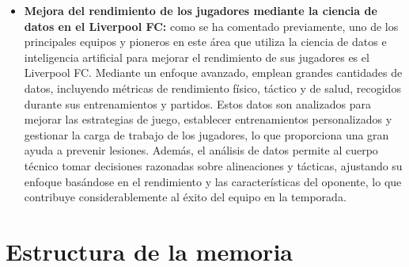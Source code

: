 \begin{itemize}
\item \textbf{Mejora del rendimiento de los jugadores mediante la ciencia de datos en el Liverpool FC:} como se ha comentado previamente, uno de los principales equipos y pioneros en este área que utiliza la ciencia de datos e inteligencia artificial para mejorar el rendimiento de sus jugadores es el Liverpool FC. Mediante un enfoque avanzado, emplean grandes cantidades de datos, incluyendo métricas de rendimiento físico, táctico y de salud, recogidos durante sus entrenamientos y partidos. Estos datos son analizados para mejorar las estrategias de juego, establecer entrenamientos personalizados y gestionar la carga de trabajo de los jugadores, lo que proporciona una gran ayuda a prevenir lesiones. Además, el análisis de datos permite al cuerpo técnico tomar decisiones razonadas sobre alineaciones y tácticas, ajustando su enfoque basándose en el rendimiento y las características del oponente, lo que contribuye considerablemente al éxito del equipo en la temporada.

\end{itemize}
















\section{Estructura de la memoria}

